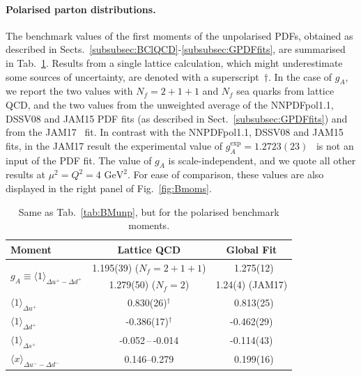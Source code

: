 \paragraph{Polarised parton distributions.}
%
%
The benchmark values of the first moments of the unpolarised PDFs, obtained
as described in Sects.~\ref{subsubsec:BClQCD}-\ref{subsubsec:GPDFfits}, 
are summarised in Tab.~\ref{tab:BMpol}.
%
Results from a single lattice calculation, which might underestimate some 
sources of uncertainty, are denoted with a superscript~$\dagger$.
%
In the case of $g_A$, we report the two values with $N_f=2+1+1$ and
$N_f$ sea quarks from lattice QCD, and the two values from the 
unweighted average of the NNPDFpol1.1, DSSV08 and JAM15 PDF fits
(as described in Sect.~\ref{subsubsec:GPDFfits}) and from the 
JAM17~\cite{Ethier:2017zbq} fit.
%
In contrast with the NNPDFpol1.1, DSSV08 and JAM15 fits, in the JAM17 result the experimental value of 
$g_A^{\mathrm{exp}} = 1.2723(23)$~\cite{Olive:2016xmw} is not an input of the PDF fit.
%
The value of $g_A$ is scale-independent, and we quote all other results at $\mu^2=Q^2=4\mbox{ GeV}^2$.
%
For ease of comparison, these values are also displayed in 
the right panel of Fig.~\ref{fig:Bmoms}.

\begin{table}[!t]
\centering
\renewcommand{\arraystretch}{1.2}
\begin{tabular}{lcc}
\toprule
Moment & Lattice QCD & Global Fit\\
\midrule
\multirow{2}{*}{$g_A\equiv\langle 1\rangle_{\Delta u^+ - \Delta d^+}$} 
& 1.195(39) ($N_f=2+1+1$) 
& \ 1.275(12) \\
& 1.279(50) ($N_f=2$) 
& 1.24(4) (JAM17)\\
$\langle 1 \rangle_{\Delta u^+}$     
& 0.830(26)$^\dagger$ 
& \ 0.813(25)\\
$\langle 1 \rangle_{\Delta d^+}$     
& -0.386(17)$^\dagger$ 
& -0.462(29)\\
$\langle 1 \rangle_{\Delta s^+}$     
& -0.052\,--\,-0.014
& -0.114(43)\\
$\langle x\rangle_{\Delta u^- - \Delta d^-}$       
& \numrange{0.146}{0.279} 
& \ 0.199(16)\\
\bottomrule
\end{tabular}
\caption{\small Same as Tab.~\ref{tab:BMunp}, but for the polarised benchmark 
moments.}
\label{tab:BMpol}
\end{table}

